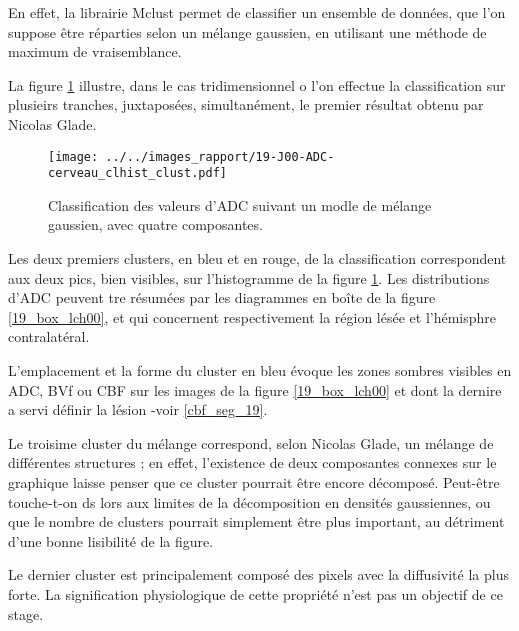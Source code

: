 \par
En effet, la librairie Mclust permet de classifier un ensemble de donn\'ees, que l'on suppose \^etre r\'eparties selon un m\'elange gaussien, %
en utilisant une m\'ethode de maximum de vraisemblance.

\par
La figure \ref{exem_ADC_19} illustre, dans le cas tridimensionnel o l'on effectue la classification sur plusieirs tranches, juxtapos\'ees, simultan\'ement, %
le premier r\'esultat obtenu par Nicolas Glade.

\begin{figure}[H]
\texttt{[image: ../../images\_rapport/19-J00-ADC-cerveau\_clhist\_clust.pdf]}
\caption{Classification des valeurs d'ADC suivant un modle de m\'elange gaussien, avec quatre composantes.
%
}
\label{exem_ADC_19}
\end{figure}

\par
Les deux premiers clusters, en bleu et en rouge, de la classification correspondent aux deux pics, bien visibles, sur l'histogramme de la figure \ref{exem_ADC_19}. %
Les distributions d'ADC peuvent tre r\'esum\'ees par les diagrammes en bo\^ite de la figure \ref{19_box_lch00}, %
et qui concernent respectivement la r\'egion l\'es\'ee et l'h\'emisphre contralat\'eral.

\par
L'emplacement et la forme du cluster en bleu \'evoque les zones sombres visibles en ADC, BVf ou CBF sur les images de la figure \ref{19_box_lch00} %
et dont la dernire a servi  d\'efinir la l\'esion -voir \ref{cbf_seg_19}.

\par
Le troisime cluster du m\'elange correspond, selon Nicolas Glade,  un m\'elange de diff\'erentes structures ; %
en effet, l'existence de deux composantes connexes sur le graphique laisse penser que ce cluster pourrait \^etre encore d\'ecompos\'e. %
Peut-\^etre touche-t-on ds lors aux limites de la d\'ecomposition en densit\'es gaussiennes, ou que le nombre de clusters pourrait simplement \^etre plus important, %
au d\'etriment d'une bonne lisibilit\'e de la figure.

\par
Le dernier cluster est principalement compos\'e des pixels avec la diffusivit\'e la plus forte. La signification physiologique de cette propri\'et\'e n'est pas un objectif de ce stage.

